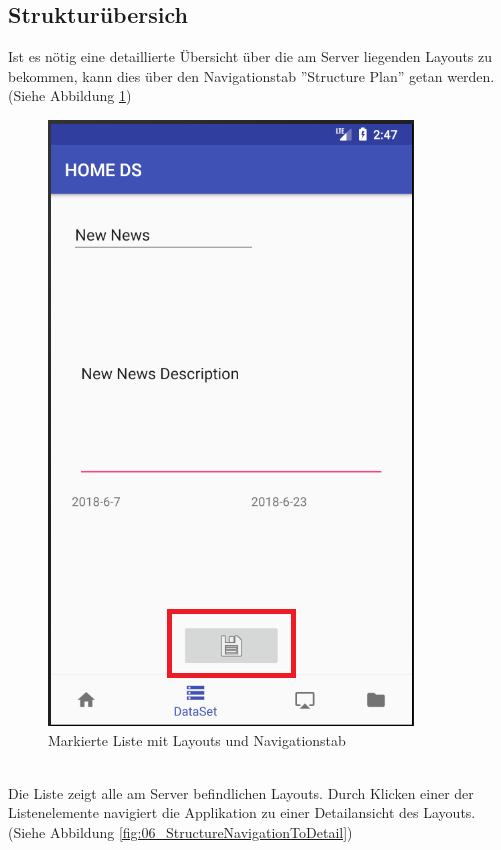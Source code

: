 \subsection{Strukturübersich}
Ist es nötig eine detaillierte Übersicht über die am Server liegenden Layouts zu bekommen, kann dies über den Navigationstab ''Structure Plan'' getan werden.(Siehe Abbildung \ref{fig:06_EditNewsSaveButton}) 
\\
\begin{figure}[H]
\centering
\includegraphics[scale=0.35]{images/06_AndroidApp/06_EditNewsSaveButton}
\caption{Markierte Liste mit Layouts und Navigationstab}
\label{fig:06_EditNewsSaveButton}
\end{figure}
\\
Die Liste zeigt alle am Server befindlichen Layouts. Durch Klicken einer der Listenelemente navigiert die Applikation zu einer Detailansicht des Layouts.(Siehe Abbildung \ref{fig:06_StructureNavigationToDetail})
\\
